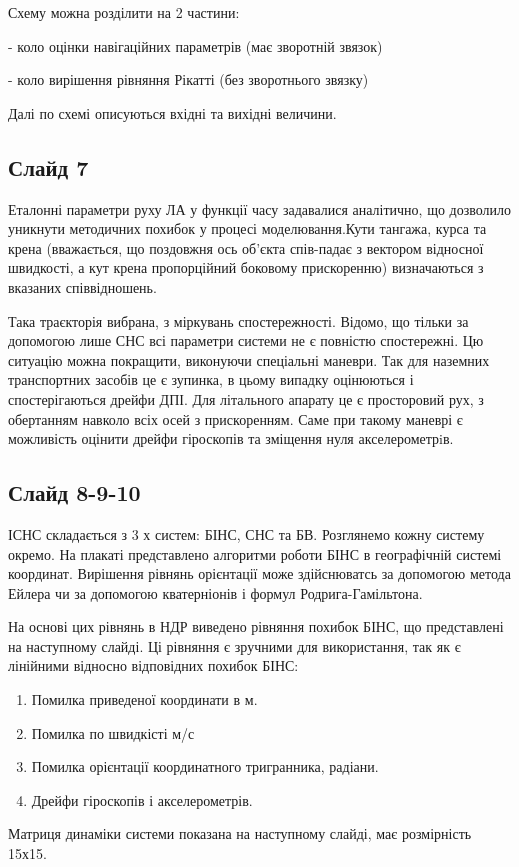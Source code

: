 \documentclass[ukrainian,utf8,simple,floatsubsection, hpadding=1mm,equationsubsection,12pt]{eskdtext}
\begin{document}
Схему можна розділити на 2 частини:

- коло оцінки навігаційних параметрів (має зворотній звязок)

- коло вирішення рівняння Рікатті (без зворотнього звязку)

Далі по схемі описуються вхідні та вихідні величини.

\subsection*{Слайд 7}

Еталонні параметри руху ЛА у функції часу задавалися аналітично, що дозволило уникнути методичних похибок у процесі моделювання.Кути тангажа, курса та крена (вважається, що поздовжня ось об’єкта спів-падає з вектором відносної швидкості, а кут крена пропорційний боковому прискоренню) визначаються з вказаних співвідношень.

Така траєкторія вибрана, з міркувань спостережності. Відомо, що тільки за допомогою лише СНС всі параметри системи не є повністю спостережні. Цю ситуацію можна покращити, виконуючи спеціальні маневри. Так для наземних транспортних засобів це є зупинка, в цьому випадку оцінюються і спостерігаються дрейфи ДПІ. Для літального апарату це є просторовий рух, з обертанням навколо всіх осей з прискоренням. Саме при такому маневрі є можливість оцінити дрейфи гіроскопів та зміщення нуля акселерометрiв.
\subsection*{Слайд 8-9-10}

ІСНС складається з 3 х систем: БІНС, СНС та БВ. Розглянемо кожну систему окремо. На плакаті представлено алгоритми роботи БІНС в географічній системі координат. Вирішення рівнянь орієнтації може здійснюватсь за допомогою метода Ейлера чи за допомогою кватерніонів і формул Родрига-Гамільтона.

На основі цих рівнянь в НДР виведено рівняння похибок БІНС, що представлені на наступному слайді. 
Ці рівняння є зручними для використання, так як є лінійними відносно відповідних похибок БІНС:
\begin{enumerate}
 \item Помилка приведеної координати в м.
 \item Помилка по швидкісті м/с
 \item Помилка орієнтації координатного тригранника, радіани.
 \item Дрейфи гіроскопів і акселерометрів.
\end{enumerate}
Матриця динаміки системи показана на наступному слайді, має розмірність 15х15.
\end{document}
